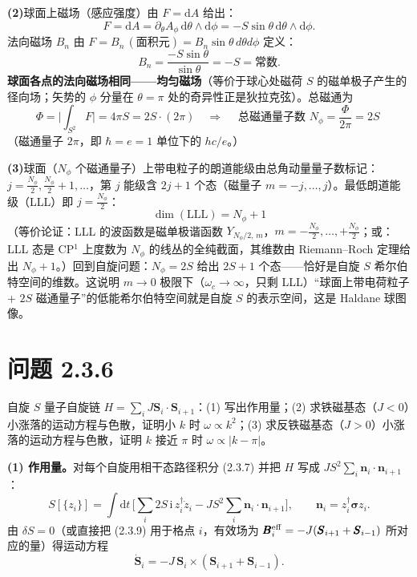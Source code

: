 \textbf{(2)}球面上磁场（感应强度）由 $F=\mathrm{d}A$ 给出：
\begin{equation*}
F=\mathrm{d}A=\partial_\theta A_\phi\,\mathrm{d}\theta\wedge\mathrm{d}\phi
=-S\sin\theta\,\mathrm{d}\theta\wedge\mathrm{d}\phi .
\end{equation*}
法向磁场 $B_n$ 由 $F=B_n\,(\text{面积元})=B_n\sin\theta\,d\theta d\phi$ 定义：
\begin{equation*}
B_n=\frac{-S\sin\theta}{\sin\theta}=-S=\text{常数}.
\end{equation*}
\textbf{球面各点的法向磁场相同——均匀磁场}（等价于球心处磁荷 $S$ 的磁单极子产生的径向场；矢势的 $\phi$ 分量在 $\theta=\pi$ 处的奇异性正是狄拉克弦）。总磁通为
\begin{equation*}
\Phi=\Big|\int_{S^2}F\Big|=4\pi S=2S\cdot(2\pi)
\quad\Longrightarrow\quad
\boxed{\;\text{总磁通量子数 }N_\phi=\frac{\Phi}{2\pi}=2S\;}
\end{equation*}
（磁通量子 $2\pi$，即 $\hbar=e=1$ 单位下的 $hc/e$。）

\textbf{(3)}球面（$N_\phi$ 个磁通量子）上带电粒子的朗道能级由总角动量量子数标记：$j=\frac{N_\phi}2,\frac{N_\phi}2+1,\dots$，第 $j$ 能级含 $2j+1$ 个态（磁量子 $m=-j,\dots,j$）。最低朗道能级（LLL）即 $j=\frac{N_\phi}2$：
\begin{equation*}
\boxed{\;\dim(\text{LLL})=N_\phi+1\;}
\end{equation*}
（等价论证：LLL 的波函数是磁单极谐函数 $Y_{N_\phi/2,\,m}$，$m=-\frac{N_\phi}{2},\dots,+\frac{N_\phi}{2}$；或：LLL 态是 CP$^1$ 上度数为 $N_\phi$ 的线丛的全纯截面，其维数由 Riemann--Roch 定理给出 $N_\phi+1$。）回到自旋问题：$N_\phi=2S$ 给出 $2S+1$ 个态——恰好是自旋 $S$ 希尔伯特空间的维数。这说明 $m\to0$ 极限下（$\omega_c\to\infty$，只剩 LLL）“球面上带电荷粒子 + $2S$ 磁通量子”的低能希尔伯特空间就是自旋 $S$ 的表示空间，这是 Haldane 球图像。

\section*{问题 2.3.6}
\begin{problem}
自旋 $S$ 量子自旋链 $H=\sum_iJ\pmb S_i\cdot\pmb S_{i+1}$：(1) 写出作用量；(2) 求铁磁基态（$J<0$）小涨落的运动方程与色散，证明小 $k$ 时 $\omega\propto k^2$；(3) 求反铁磁基态（$J>0$）小涨落的运动方程与色散，证明 $k$ 接近 $\pi$ 时 $\omega\propto|k-\pi|$。
\end{problem}
\solution
\textbf{(1) 作用量。}对每个自旋用相干态路径积分 (2.3.7) 并把 $H$ 写成 $J S^2\sum_i\pmb n_i\cdot\pmb n_{i+1}$：
\begin{equation*}
S[\{z_i\}]=\int\mathrm{d}t\,\Big[\sum_i2S\,\mathrm{i}\,z_i^\dagger\dot z_i
-JS^2\sum_i\pmb n_i\cdot\pmb n_{i+1}\Big],
\qquad \pmb n_i=z_i^\dagger\pmb\sigma z_i .
\end{equation*}
由 $\delta S=0$（或直接把 (2.3.9) 用于格点 $i$，有效场为 $\pmb B_i^{\rm eff}=-J(\pmb S_{i+1}+\pmb S_{i-1})$ 所对应的量）得运动方程
\begin{equation*}
\dot{\pmb S}_i=-J\,\pmb S_i\times(\pmb S_{i+1}+\pmb S_{i-1}).
\end{equation*}

